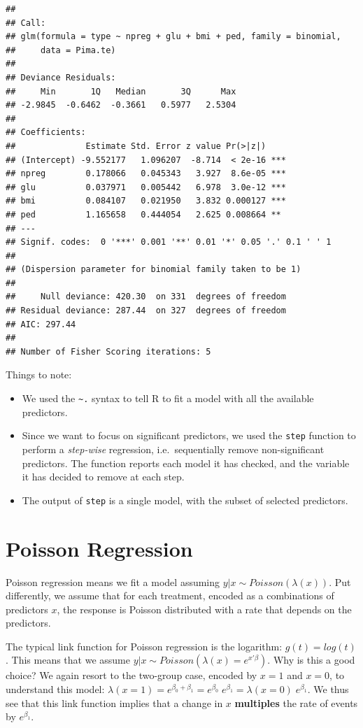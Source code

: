 \documentclass[]{book}
\providecommand{\tightlist}{%
  \setlength{\itemsep}{0pt}\setlength{\parskip}{0pt}}
\theoremstyle{definition}
\theoremstyle{definition}
\theoremstyle{definition}
\theoremstyle{remark}
\begin{document}
\begin{verbatim}
## 
## Call:
## glm(formula = type ~ npreg + glu + bmi + ped, family = binomial, 
##     data = Pima.te)
## 
## Deviance Residuals: 
##     Min       1Q   Median       3Q      Max  
## -2.9845  -0.6462  -0.3661   0.5977   2.5304  
## 
## Coefficients:
##              Estimate Std. Error z value Pr(>|z|)    
## (Intercept) -9.552177   1.096207  -8.714  < 2e-16 ***
## npreg        0.178066   0.045343   3.927  8.6e-05 ***
## glu          0.037971   0.005442   6.978  3.0e-12 ***
## bmi          0.084107   0.021950   3.832 0.000127 ***
## ped          1.165658   0.444054   2.625 0.008664 ** 
## ---
## Signif. codes:  0 '***' 0.001 '**' 0.01 '*' 0.05 '.' 0.1 ' ' 1
## 
## (Dispersion parameter for binomial family taken to be 1)
## 
##     Null deviance: 420.30  on 331  degrees of freedom
## Residual deviance: 287.44  on 327  degrees of freedom
## AIC: 297.44
## 
## Number of Fisher Scoring iterations: 5
\end{verbatim}

Things to note:

\begin{itemize}
\tightlist
\item
  We used the \texttt{\textasciitilde{}.} syntax to tell R to fit a
  model with all the available predictors.
\item
  Since we want to focus on significant predictors, we used the
  \texttt{step} function to perform a \emph{step-wise} regression,
  i.e.~sequentially remove non-significant predictors. The function
  reports each model it has checked, and the variable it has decided to
  remove at each step.
\item
  The output of \texttt{step} is a single model, with the subset of
  selected predictors.
\end{itemize}

\section{Poisson Regression}\label{poisson-regression}

Poisson regression means we fit a model assuming
\(y|x \sim Poisson(\lambda(x))\). Put differently, we assume that for
each treatment, encoded as a combinations of predictors \(x\), the
response is Poisson distributed with a rate that depends on the
predictors.

The typical link function for Poisson regression is the logarithm:
\(g(t)=log(t)\). This means that we assume
\(y|x \sim Poisson(\lambda(x) = e^{x'\beta})\). Why is this a good
choice? We again resort to the two-group case, encoded by \(x=1\) and
\(x=0\), to understand this model:
\(\lambda(x=1)=e^{\beta_0+\beta_1}=e^{\beta_0} \; e^{\beta_1}= \lambda(x=0) \; e^{\beta_1}\).
We thus see that this link function implies that a change in \(x\)
\textbf{multiples} the rate of events by \(e^{\beta_1}\).
\end{document}
